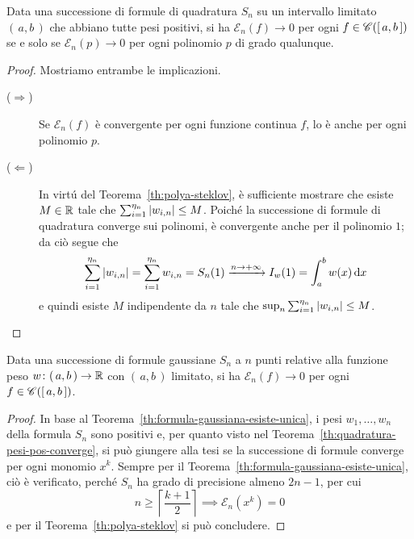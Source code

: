 	\begin{teorema}\label{th:quadratura-pesi-pos-converge}
		Data una successione di formule di quadratura \(S_n\) su un intervallo limitato \((\, a, b \,)\) che abbiano tutte pesi positivi, si ha \(\mathcal{E}_n (f) \to 0\) per ogni \(f \in \mathscr{C} ([\, a, b \,])\) se e solo se \(\mathcal{E}_n (p) \to 0\) per ogni polinomio \(p\) di grado qualunque.
	\end{teorema}

	\begin{proof}
		Mostriamo entrambe le implicazioni.
		
		\begin{description}
			\item[(\(\Rightarrow\))] Se \(\mathcal{E}_n (f)\) è convergente per ogni funzione continua \(f\), lo è anche per ogni polinomio \(p\).
			\item[(\(\Leftarrow\))] In virtú del Teorema~\ref{th:polya-steklov}, è sufficiente mostrare che esiste \(M \in \mathbb{R}\) tale che \(\sum_{i = 1}^{\eta_n} \abs{w_{i, n}} \le M\). Poiché la successione di formule di quadratura converge sui polinomi, è convergente anche per il polinomio \(1\); da ciò segue che
			\begin{equation*}
				\sum_{i = 1}^{\eta_n} \abs{w_{i, n}} = \sum_{i = 1}^{\eta_n} w_{i, n} = S_n (1) \xrightarrow{n \to + \infty} I_w (1) = \int_a^b w (x) \dd{x}
			\end{equation*}
			e quindi esiste \(M\) indipendente da \(n\) tale che \(\sup_n \sum_{i = 1}^{\eta_n} \abs{w_{i, n}} \le M\).\qedhere
		\end{description}
	\end{proof}

	\begin{teorema}
		Data una successione di formule gaussiane \(S_n\) a \(n\) punti relative alla funzione peso \(w \colon (\, a, b \,) \to \mathbb{R}\) con \((\, a, b \,)\) limitato, si ha \(\mathcal{E}_n (f) \to 0\) per ogni \(f \in \mathscr{C} ([\, a, b \,])\).
	\end{teorema}

	\begin{proof}
		In base al Teorema~\ref{th:formula-gaussiana-esiste-unica}, i pesi \(w_1, \dots, w_n\) della formula \(S_n\) sono positivi e, per quanto visto nel Teorema~\ref{th:quadratura-pesi-pos-converge}, si può giungere alla tesi se la successione di formule converge per ogni monomio \(x^k\). Sempre per il Teorema~\ref{th:formula-gaussiana-esiste-unica}, ciò è verificato, perché \(S_n\) ha grado di precisione almeno \(2 n - 1\), per cui
		\begin{equation*}
			n \ge \left\lceil \frac{k + 1}{2} \right\rceil \implies \mathcal{E}_n (x^k) = 0 %
		\end{equation*}
		e per il Teorema~\ref{th:polya-steklov} si può concludere.
	\end{proof}